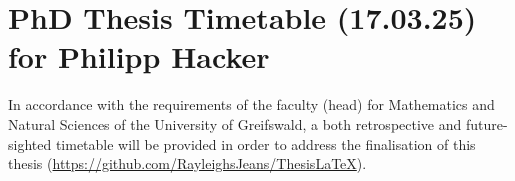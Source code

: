 \documentclass[%
    a4,
    10pt,
    twoside
    ]{%
    scrreprt%
    }
\newcommand{\foo}{%
  \hspace{-2.3pt}$\bullet$ \hspace{5pt}%
}
\begin{document}
%

  \thispagestyle{empty}

  \section*{%
    PhD Thesis Timetable (17.03.25) for Philipp Hacker%
  }%
    
  In accordance with the requirements of the faculty (head) for Mathematics and Natural Sciences of the University of Greifswald, a both retrospective and future-sighted timetable will be provided in order to address the finalisation of this thesis (\url{https://github.com/RayleighsJeans/ThesisLaTeX}).

  \begin{table}[h!]%

    \begin{tabular}{r |@{\foo} p{}}%


\end{tabular}
\end{table}
\end{document}
